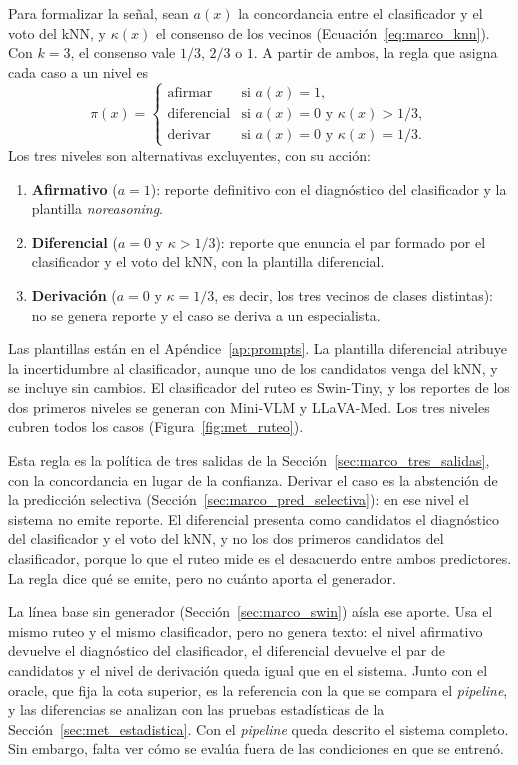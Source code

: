 Para formalizar la señal, sean $a(x)$ la concordancia entre el clasificador y el voto del kNN, y $\kappa(x)$ el consenso
de los vecinos (Ecuación~\ref{eq:marco_knn}). Con $k = 3$, el consenso vale $1/3$, $2/3$ o $1$. A partir de ambos, la
regla que asigna cada caso a un nivel es
\begin{equation}
    \pi(x) =
    \begin{cases}
        \text{afirmar} & \text{si } a(x) = 1,\\
        \text{diferencial} & \text{si } a(x) = 0 \text{ y } \kappa(x) > 1/3,\\
        \text{derivar} & \text{si } a(x) = 0 \text{ y } \kappa(x) = 1/3.
    \end{cases}
    \label{eq:met_politica_ruteo}
\end{equation}
Los tres niveles son alternativas excluyentes, con su acción:
\begin{enumerate}
    \item \textbf{Afirmativo} ($a = 1$): reporte definitivo con el diagnóstico del clasificador y la plantilla
    \emph{noreasoning}.
    \item \textbf{Diferencial} ($a = 0$ y $\kappa > 1/3$): reporte que enuncia el par formado por el clasificador y el
    voto del kNN, con la plantilla diferencial.
    \item \textbf{Derivación} ($a = 0$ y $\kappa = 1/3$, es decir, los tres vecinos de clases distintas): no se genera
    reporte y el caso se deriva a un especialista.
\end{enumerate}
Las plantillas están en el Apéndice~\ref{ap:prompts}. La plantilla diferencial atribuye la incertidumbre al
clasificador, aunque uno de los candidatos venga del kNN, y se incluye sin cambios. El clasificador del ruteo es
Swin-Tiny, y los reportes de los dos primeros niveles se generan con Mini-VLM y LLaVA-Med. Los tres niveles cubren todos
los casos (Figura~\ref{fig:met_ruteo}).



Esta regla es la política de tres salidas de la Sección~\ref{sec:marco_tres_salidas}, con la concordancia en lugar de la
confianza. Derivar el caso es la abstención de la predicción selectiva (Sección~\ref{sec:marco_pred_selectiva}): en
ese nivel el sistema no emite reporte. El diferencial presenta como candidatos el diagnóstico del clasificador y el voto del kNN, y no los
dos primeros candidatos del clasificador, porque lo que el ruteo mide es el desacuerdo entre ambos predictores. La regla dice
qué se emite, pero no cuánto aporta el generador.

La línea base sin generador (Sección~\ref{sec:marco_swin}) aísla ese aporte. Usa el mismo ruteo y el mismo
clasificador, pero no genera texto: el nivel afirmativo devuelve el diagnóstico del clasificador, el diferencial devuelve
el par de candidatos y el nivel de derivación queda igual que en el sistema. Junto con el oracle, que fija la cota
superior, es la referencia con la que se compara el \emph{pipeline}, y las diferencias se analizan con las pruebas
estadísticas de la Sección~\ref{sec:met_estadistica}. Con el \emph{pipeline} queda descrito el sistema completo. Sin embargo, falta
ver cómo se evalúa fuera de las condiciones en que se entrenó.
